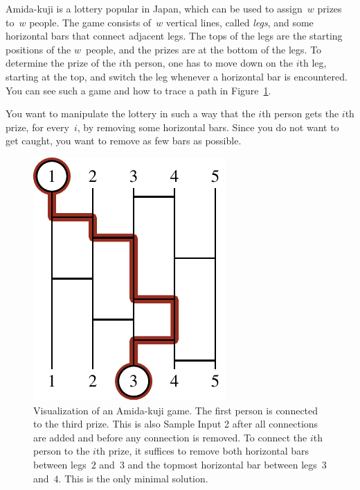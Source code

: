 \problemname{\problemyamlname}

%
Amida-kuji is a lottery popular in Japan, which can be used to assign~$w$ prizes to~$w$ people.
The game consists of~$w$ vertical lines, called \emph{legs}, and some horizontal bars that connect adjacent legs.
The tops of the legs are the starting positions of the $w$~people, and the prizes are at the bottom of the legs.
To determine the prize of the $i$th person, one has to move down on the $i$th leg, starting at the top, and switch the leg whenever a horizontal bar is encountered.
You can see such a game and how to trace a path in Figure~\ref{fig:amidakuji}.

You want to manipulate the lottery in such a way that the $i$th person gets the $i$th prize,
for every~$i$, by removing some horizontal bars.
Since you do not want to get caught, you want to remove as few bars as possible.

\begin{figure}[h]
	\centering
	\includegraphics{sample}
	\caption{Visualization of an Amida-kuji game. 
		The first person is connected to the third prize.
		This is also Sample Input 2 after all connections are added and before any connection is removed.
		To connect the $i$th person to the $i$th prize, it suffices to remove both horizontal bars between legs~$2$ and~$3$ and the topmost horizontal bar between legs~$3$ and~$4$.
		This is the only minimal solution.}\label{fig:amidakuji}
\end{figure}

